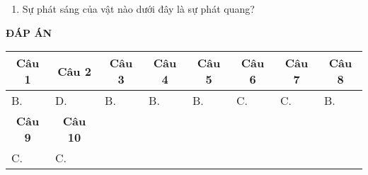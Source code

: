 \begin{enumerate}
	\item Sự phát sáng của vật nào dưới đây là sự phát quang?
\end{enumerate}
\begin{center}
	\textbf{ĐÁP ÁN}
	
\end{center}

\begin{longtable}[\textwidth]{|p{}|p{}|p{}|p{}|p{}|p{}|p{}|p{}|}
	\hline%
	\multicolumn{1}{|c|}{\textbf{Câu 1}} & \multicolumn{1}{c|}{\textbf{Câu 2}} & \multicolumn{1}{c|}{\textbf{Câu 3}} &
	\multicolumn{1}{c|}{\textbf{Câu 4}} &
	\multicolumn{1}{c|}{\textbf{Câu 5}} &
	\multicolumn{1}{c|}{\textbf{Câu 6}} &
	\multicolumn{1}{c|}{\textbf{Câu 7}} &
	\multicolumn{1}{c|}{\textbf{Câu 8}}\\
	\hline
	B. &D. &B. &B. &B. &C. &C. &B.\\
	\hline
	
	\multicolumn{1}{|c|}{\textbf{Câu 9}} & \multicolumn{1}{c|}{\textbf{Câu 10}} & \multicolumn{1}{c|}{\textbf{}} &
	\multicolumn{1}{c|}{\textbf{}} &
	\multicolumn{1}{c|}{\textbf{}} &
	\multicolumn{1}{c|}{\textbf{}} &
	\multicolumn{1}{c|}{\textbf{}} &
	\multicolumn{1}{c|}{} \\
	\hline
	C. &C. & & & & & &\\
	\hline		
\end{longtable}









